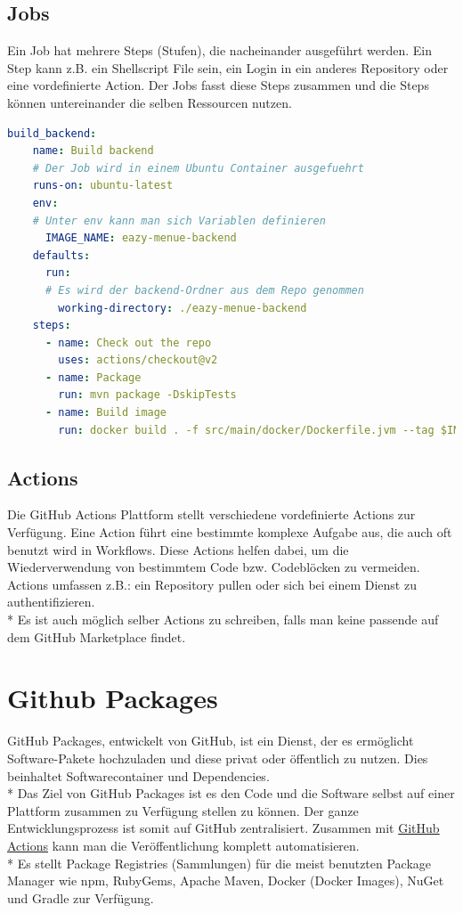 \subsection{Jobs}
Ein Job hat mehrere Steps (Stufen), die nacheinander ausgeführt werden. Ein Step kann z.B. ein Shellscript File sein, ein
Login in ein anderes Repository oder eine vordefinierte Action. Der Jobs fasst diese Steps zusammen und die Steps können untereinander die selben Ressourcen nutzen.\cite{GHAction}

\begin{lstlisting}[language=yaml,caption=Ausschnitt eines Jobs]
    build_backend:
    name: Build backend
    # Der Job wird in einem Ubuntu Container ausgefuehrt
    runs-on: ubuntu-latest
    env:
    # Unter env kann man sich Variablen definieren
      IMAGE_NAME: eazy-menue-backend
    defaults:
      run:
      # Es wird der backend-Ordner aus dem Repo genommen
        working-directory: ./eazy-menue-backend
    steps:
      - name: Check out the repo
        uses: actions/checkout@v2
      - name: Package
        run: mvn package -DskipTests
      - name: Build image
        run: docker build . -f src/main/docker/Dockerfile.jvm --tag $IMAGE_NAME
\end{lstlisting}

\subsection{Actions}
Die GitHub Actions Plattform stellt verschiedene vordefinierte Actions zur Verfügung.
Eine Action führt eine bestimmte komplexe Aufgabe aus, die auch oft benutzt wird in Workflows. Diese Actions helfen dabei,
um die Wiederverwendung von bestimmtem Code bzw. Codeblöcken zu vermeiden.
Actions umfassen z.B.: ein Repository pullen oder sich bei einem Dienst zu authentifizieren.\\*
Es ist auch möglich selber Actions zu schreiben, falls man keine passende auf dem GitHub Marketplace findet.\cite{GHAction}

\section{Github Packages}
\author{Benjamin Besic}
GitHub Packages, entwickelt von GitHub, ist ein Dienst, der es ermöglicht Software-Pakete hochzuladen und diese privat oder öffentlich zu nutzen.
Dies beinhaltet Softwarecontainer und Dependencies. \\*
Das Ziel von GitHub Packages ist es den Code und die Software selbst auf einer Plattform zusammen zu Verfügung stellen zu können.
Der ganze Entwicklungsprozess ist somit auf GitHub zentralisiert. Zusammen mit \hyperref[sec:GHAction]{GitHub Actions} kann man die Veröffentlichung
komplett automatisieren. \\*
Es stellt Package Registries (Sammlungen) für die meist benutzten Package Manager wie npm, RubyGems, Apache Maven, Docker (Docker Images), 
NuGet und Gradle zur Verfügung. \cite{GHPack}

